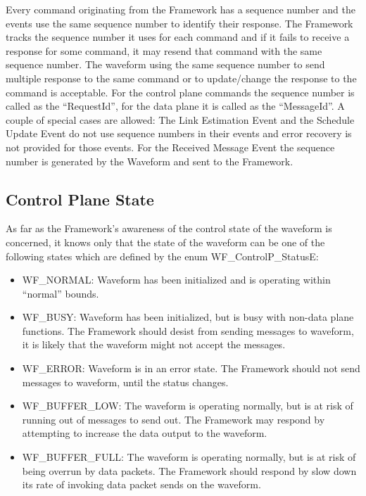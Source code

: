 Every command originating from the Framework has a sequence number and the events use the same sequence number to identify their response.  The Framework tracks the sequence number it uses for each command and if it fails to receive a response for some command, it may resend that command with the same sequence number.  The waveform using the same sequence number to send multiple response to the same command or to update/change the response to the command is acceptable.  For the control plane commands the sequence number is called as the “RequestId”, for the data plane it is called as the “MessageId”.  A couple of special cases are allowed:  The Link Estimation Event and the Schedule Update Event do not use sequence numbers in their events and error recovery is not provided for those events.  For the Received Message Event the sequence number is generated by the Waveform and sent to the Framework.

\subsection {Control Plane State}

As far as the Framework’s awareness of the control state of the waveform is concerned, it knows only that the state of the waveform can be one of the following states which are defined by the enum WF\_ControlP\_StatusE:
\begin{itemize}
	\item WF\_NORMAL:  Waveform has been initialized and is operating within “normal” bounds.
	\item WF\_BUSY:  Waveform has been initialized, but is busy with non-data plane functions. The Framework should desist from sending messages to waveform, it is likely that the waveform might not accept the messages.
	\item WF\_ERROR:  Waveform is in an error state. The Framework should not send messages to waveform, until the status changes.
	\item WF\_BUFFER\_LOW:  The waveform is operating normally, but is at risk of running out of messages to send out. The Framework may respond by attempting to increase the data output to the waveform.
	\item WF\_BUFFER\_FULL:  The waveform is operating normally, but is at risk of being overrun by data packets. The Framework should respond by slow down its rate of invoking data packet sends on the waveform.
\end{itemize}


